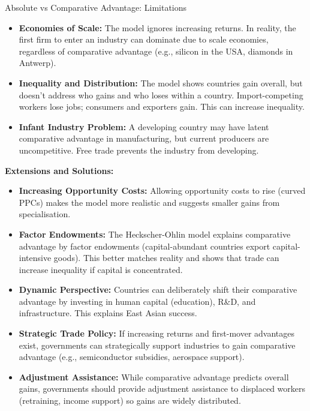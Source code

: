 \documentclass[11pt, a4paper, twoside]{book}
\begin{document}
\begin{evaluation}{Absolute vs Comparative Advantage: Limitations}
\begin{itemize}
  \item \textbf{Economies of Scale:} The model ignores increasing returns. In reality, the first firm to enter an industry can dominate due to scale economies, regardless of comparative advantage (e.g., silicon in the USA, diamonds in Antwerp).
  \item \textbf{Inequality and Distribution:} The model shows countries gain overall, but doesn't address who gains and who loses within a country. Import-competing workers lose jobs; consumers and exporters gain. This can increase inequality.
  \item \textbf{Infant Industry Problem:} A developing country may have latent comparative advantage in manufacturing, but current producers are uncompetitive. Free trade prevents the industry from developing.
\end{itemize}

\textbf{Extensions and Solutions:}
\begin{itemize}
  \item \textbf{Increasing Opportunity Costs:} Allowing opportunity costs to rise (curved PPCs) makes the model more realistic and suggests smaller gains from specialisation.
  \item \textbf{Factor Endowments:} The Heckscher-Ohlin model explains comparative advantage by factor endowments (capital-abundant countries export capital-intensive goods). This better matches reality and shows that trade can increase inequality if capital is concentrated.
  \item \textbf{Dynamic Perspective:} Countries can deliberately shift their comparative advantage by investing in human capital (education), R\&D, and infrastructure. This explains East Asian success.
  \item \textbf{Strategic Trade Policy:} If increasing returns and first-mover advantages exist, governments can strategically support industries to gain comparative advantage (e.g., semiconductor subsidies, aerospace support).
  \item \textbf{Adjustment Assistance:} While comparative advantage predicts overall gains, governments should provide adjustment assistance to displaced workers (retraining, income support) so gains are widely distributed.
\end{itemize}


\end{evaluation}
\end{document}
